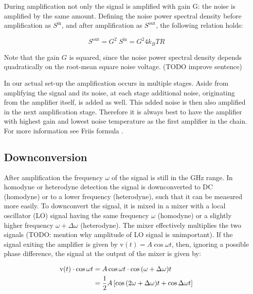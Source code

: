 \documentclass[12pt]{report}
\begin{document}
During amplification not only the signal is amplified with gain G: the noise is amplified by the same amount. Defining the noise power spectral density before amplification as $S^\text{in}$, and after amplification as $S^\text{out}$, the following relation holds:

\begin{equation}
    S^\text{out} = G^2\; S^\text{in} = G^2 4 k_B T R
    \label{eqn:noise power spectral density amplification}
\end{equation}

Note that the gain $G$ is squared, since the noise power spectral density depends quadratically on the root-mean square noise voltage. (TODO improve sentence)

In our actual set-up the amplification occurs in multiple stages. Aside from amplifying the signal and its noise, at each stage additional noise, originating from the amplifier itself, is added as well. This added noise is then also amplified in the next amplification stage.   Therefore it is always best to have the amplifier with highest gain and lowest noise temperature as the first amplifier in the chain. For more information see Friis formula \cite[p.~103]{vasilescu2006electronic}.



\subsection{Downconversion}

After amplification the frequency $\omega$ of the signal is still in the GHz range. In homodyne or heterodyne detection the signal is downconverted to DC (homodyne) or to a lower frequency (heterodyne), such that it can be measured more easily. To downconvert the signal, it is mixed in a mixer with a local oscillator (LO) signal having the same frequency $\omega$ (homodyne) or a slightly higher frequency $\omega + \Delta \omega$ (heterodyne). The mixer effectively multiplies the two signals (TODO: mention why amplitude of LO signal is unimportant). If the signal exiting the amplifier is given by $\text{v}(t) = A\cos \omega t$, then, ignoring a possible phase difference, the signal at the output of the mixer is given by:

\begin{align}
    \text{v}(t) \cdot \cos{\omega t}& = A \cos{\omega t} \cdot \cos{(\omega + \Delta \omega ) t} \notag\\
        & = \frac{1}{2} A \left[\cos{(2\omega + \Delta \omega)t} + \cos{\Delta \omega t}\right]
        \label{eqn:mixer}
\end{align}
\end{document}
